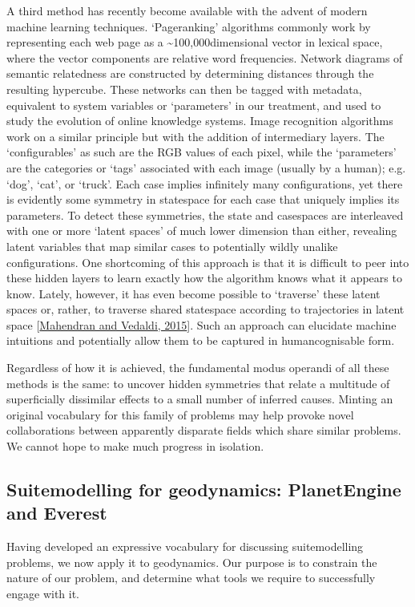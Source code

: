 \documentclass[letterpaper,10pt,english]{jupyterBook}
\begin{document}
\sphinxAtStartPar
A third method has recently become available with the advent of modern machine learning techniques. ‘Page\sphinxhyphen{}ranking’ algorithms commonly work by representing each web page as a \textasciitilde{}100,000\sphinxhyphen{}dimensional vector in lexical space, where the vector components are relative word frequencies. Network diagrams of semantic relatedness are constructed by determining distances through the resulting hypercube. These networks can then be tagged with metadata, equivalent to system variables or ‘parameters’ in our treatment, and used to study the evolution of online knowledge systems. Image recognition algorithms work on a similar principle but with the addition of intermediary layers. The ‘configurables’ as such are the RGB values of each pixel, while the ‘parameters’ are the categories or ‘tags’ associated with each image (usually by a human); e.g. ‘dog’, ‘cat’, or ‘truck’. Each case implies infinitely many configurations, yet there is evidently some symmetry in state\sphinxhyphen{}space for each case that uniquely implies its parameters. To detect these symmetries, the state\sphinxhyphen{} and case\sphinxhyphen{}spaces are interleaved with one or more ‘latent spaces’ of much lower dimension than either, revealing latent variables that map similar cases to potentially wildly unalike configurations. One shortcoming of this approach is that it is difficult to peer into these hidden layers to learn exactly how the algorithm knows what it appears to know. Lately, however, it has even become possible to ‘traverse’ these latent spaces \sphinxhyphen{} or, rather, to traverse shared state\sphinxhyphen{}space according to trajectories in latent space {[}\hyperlink{cite.references:id691}{Mahendran and Vedaldi, 2015}{]}. Such an approach can elucidate machine intuitions and potentially allow them to be captured in human\sphinxhyphen{}cognisable form.

\sphinxAtStartPar
Regardless of how it is achieved, the fundamental modus operandi of all these methods is the same: to uncover hidden symmetries that relate a multitude of superficially dissimilar effects to a small number of inferred causes. Minting an original vocabulary for this family of problems may help provoke novel collaborations between apparently disparate fields which share similar problems. We cannot hope to make much progress in isolation.


\subsection{Suite\sphinxhyphen{}modelling for geodynamics: PlanetEngine and Everest}
\label{\detokenize{content/chapter_02_methods/section3:suite-modelling-for-geodynamics-planetengine-and-everest}}
\sphinxAtStartPar
Having developed an expressive vocabulary for discussing suite\sphinxhyphen{}modelling problems, we now apply it to geodynamics. Our purpose is to constrain the nature of our problem, and determine what tools we require to successfully engage with it.
\end{document}
